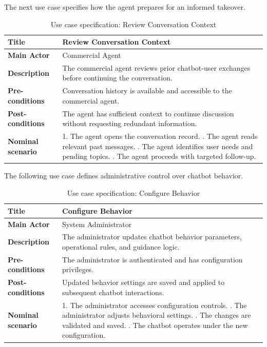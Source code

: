 \noindent The next use case specifies how the agent prepares for an informed takeover.
\begin{table}[H]
\centering
\caption{Use case specification: Review Conversation Context}
\label{tab:uc-review-conversation-context}
\begin{tabular}{|p{}|p{}|}
\hline
\textbf{Title} & Review Conversation Context \\
\hline
\textbf{Main Actor} & Commercial Agent \\
\hline
\textbf{Description} & The commercial agent reviews prior chatbot-user exchanges before continuing the conversation. \\
\hline
\textbf{Pre-conditions} & Conversation history is available and accessible to the commercial agent. \\
\hline
\textbf{Post-conditions} & The agent has sufficient context to continue discussion without requesting redundant information. \\
\hline
\textbf{Nominal scenario} & 1. The agent opens the conversation record. \newline 2. The agent reads relevant past messages. \newline 3. The agent identifies user needs and pending topics. \newline 4. The agent proceeds with targeted follow-up. \\
\hline
\end{tabular}
\end{table}

\noindent The following use case defines administrative control over chatbot behavior.
\begin{table}[H]
\centering
\caption{Use case specification: Configure Behavior}
\label{tab:uc-configure-behavior}
\begin{tabular}{|p{}|p{}|}
\hline
\textbf{Title} & Configure Behavior \\
\hline
\textbf{Main Actor} & System Administrator \\
\hline
\textbf{Description} & The administrator updates chatbot behavior parameters, operational rules, and guidance logic. \\
\hline
\textbf{Pre-conditions} & The administrator is authenticated and has configuration privileges. \\
\hline
\textbf{Post-conditions} & Updated behavior settings are saved and applied to subsequent chatbot interactions. \\
\hline
\textbf{Nominal scenario} & 1. The administrator accesses configuration controls. \newline 2. The administrator adjusts behavioral settings. \newline 3. The changes are validated and saved. \newline 4. The chatbot operates under the new configuration. \\
\hline
\end{tabular}
\end{table}

